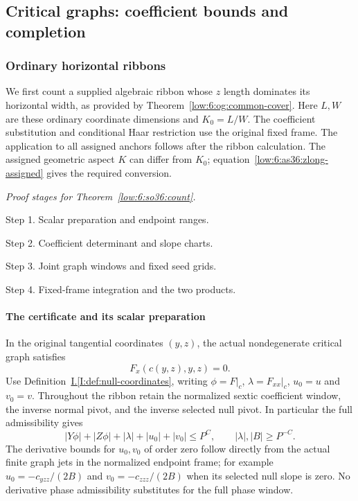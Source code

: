 \documentclass[11pt]{amsart}
\theoremstyle{definition}
\theoremstyle{remark}
\numberwithin{equation}{section}
\newcommand{\partIref}[1]{\hyperref[I:#1]{I.\ref*{I:#1}}}
\begin{document}
\subsection{Critical graphs: coefficient bounds and completion}\label{low:6:ordinary-counts}\label{low:6:so36:section}\label{low:6:sp36:section}\label{low:6:wc36:section}\label{low:6:ordinary-assembly}\label{low:6:as36:assembly}\label{low:6:s36:global}

\subsubsection{Ordinary horizontal ribbons}

We first count a supplied algebraic ribbon whose $z$ length dominates its horizontal width, as provided by Theorem~\ref{low:6:og:common-cover}. Here $L,W$ are these ordinary coordinate dimensions and $K_0=L/W$. The coefficient substitution and conditional Haar restriction use the original fixed frame. The application to all assigned anchors follows after the ribbon calculation. The assigned geometric aspect $K$ can differ from $K_0$; equation~\eqref{low:6:as36:zlong-assigned} gives the required conversion.

\par\smallskip
\noindent\textit{Proof stages for Theorem~\ref{low:6:so36:count}.}\par\nobreak
\noindent\textup{Step 1.} Scalar preparation and endpoint ranges.\par\nobreak
\noindent\textup{Step 2.} Coefficient determinant and slope charts.\par\nobreak
\noindent\textup{Step 3.} Joint graph windows and fixed seed grids.\par\nobreak
\noindent\textup{Step 4.} Fixed-frame integration and the two products.\par\nobreak
\smallskip

\paragraph{The certificate and its scalar preparation}

In the original tangential coordinates $(y,z)$, the actual nondegenerate critical graph satisfies
\[
F_x(c(y,z),y,z)=0.
\]
Use Definition~\partIref{def:null-coordinates}, writing $\phi=F|_c$, $\lambda=F_{xx}|_c$, $u_0=u$ and $v_0=v$. Throughout the ribbon retain the normalized sextic coefficient window, the inverse normal pivot, and the inverse selected null pivot. In particular the full admissibility gives
\[
|Y\phi|+|Z\phi|+|\lambda|+|u_0|+|v_0|\le P^C,\qquad |\lambda|,|B|\ge P^{-C}.
\]
The derivative bounds for $u_0,v_0$ of order zero follow directly from the actual finite graph jets in the normalized endpoint frame; for example $u_0=-c_{yzz}/(2B)$ and $v_0=-c_{zzz}/(2B)$ when its selected null slope is zero. No derivative phase admissibility substitutes for the full phase window.
\end{document}
